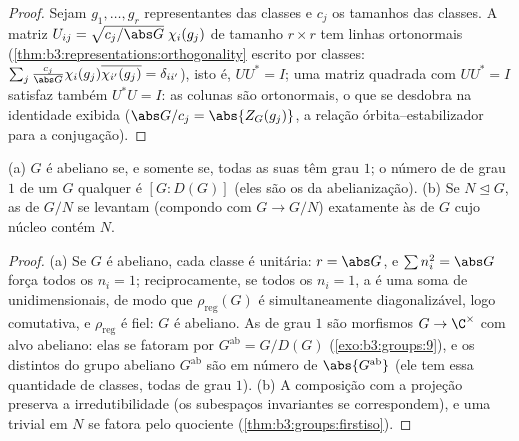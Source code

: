 \begin{proof}
Sejam $g_1, \dots, g_r$ representantes das classes e $c_j$ os tamanhos das
classes. A matriz $U_{ij} =
\sqrt{c_j/\abs G}\;\chi_i(g_j)$ de tamanho $r \times r$ tem linhas ortonormais
(\cref{thm:b3:representations:orthogonality} escrito por classes: $\sum_j \frac{c_j}{\abs G}\chi_i(g_j)\overline{\chi_{i'}(g_j)} =
\delta_{ii'}$), isto é, $UU^* = I$; uma matriz
quadrada com $UU^* =
I$ satisfaz também $U^*U = I$: as colunas são ortonormais, o
que se desdobra na identidade exibida ($\abs G/c_j = \abs{Z_G(g_j)}$, a relação
órbita--estabilizador para a conjugação).
\end{proof}

\begin{proposition}
\label{prop:b3:representations:onedim}
(a) $G$ é abeliano se, e somente se, todas as suas  têm grau $1$; o número de  de grau $1$ de
um $G$ qualquer é $[G : D(G)]$ (eles são os  da abelianização).
(b) Se $N \trianglelefteq G$, as  de $G/N$ se levantam
(compondo com $G \to G/N$) exatamente às  de
$G$ cujo núcleo contém $N$.
\end{proposition}

\begin{proof}
(a) Se $G$ é abeliano, cada classe é unitária: $r = \abs G$, e $\sum n_i^2 = \abs G$ força
todos os $n_i = 1$; reciprocamente, se todos os $n_i = 1$, a  é uma soma de  unidimensionais, de modo que $\rho_{\mathrm{reg}}(G)$
é simultaneamente diagonalizável, logo comutativa, e $\rho_{\mathrm{reg}}$ é fiel:
$G$ é abeliano. As  de grau $1$ são morfismos
$G \to \C^\times$ com alvo abeliano: elas se fatoram por $G^{\mathrm{ab}} = G/D(G)$
(\cref{exo:b3:groups:9}), e os  distintos do grupo abeliano $G^{\mathrm{ab}}$ são
em número de $\abs{G^{\mathrm{ab}}}$ (ele tem essa quantidade de classes, todas de grau
$1$). (b) A composição com a projeção preserva a irredutibilidade
(os subespaços invariantes se correspondem), e uma 
trivial em $N$ se fatora pelo quociente (\cref{thm:b3:groups:firstiso}).
\end{proof}

